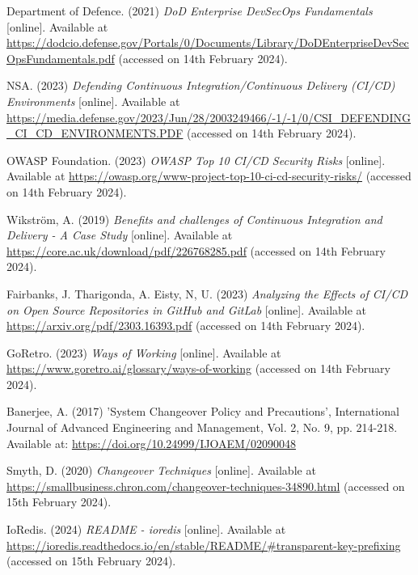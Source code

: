 \noindent Department of Defence. (2021) \textit{DoD Enterprise DevSecOps Fundamentals} [online]. Available at \url{https://dodcio.defense.gov/Portals/0/Documents/Library/DoDEnterpriseDevSecOpsFundamentals.pdf} (accessed on 14th February 2024).
\vspace{0.2cm}

\noindent NSA. (2023) \textit{Defending Continuous Integration/Continuous Delivery (CI/CD) Environments} [online]. Available at \url{https://media.defense.gov/2023/Jun/28/2003249466/-1/-1/0/CSI_DEFENDING_CI_CD_ENVIRONMENTS.PDF} (accessed on 14th February 2024).
\vspace{0.2cm}

\noindent OWASP Foundation. (2023) \textit{OWASP Top 10 CI/CD Security Risks} [online]. Available at \url{https://owasp.org/www-project-top-10-ci-cd-security-risks/} (accessed on 14th February 2024).
\vspace{0.2cm}

\noindent Wikström, A. (2019) \textit{Benefits and challenges of Continuous Integration and Delivery - A Case Study} [online]. Available at \url{https://core.ac.uk/download/pdf/226768285.pdf} (accessed on 14th February 2024).
\vspace{0.2cm}

\noindent Fairbanks, J. Tharigonda, A. Eisty, N, U. (2023) \textit{Analyzing the Effects of CI/CD on Open Source Repositories in GitHub and GitLab} [online]. Available at \url{https://arxiv.org/pdf/2303.16393.pdf} (accessed on 14th February 2024).
\vspace{0.2cm}

\noindent GoRetro. (2023) \textit{Ways of Working} [online]. Available at \url{https://www.goretro.ai/glossary/ways-of-working} (accessed on 14th February 2024).
\vspace{0.2cm}

\noindent Banerjee, A. (2017) 'System Changeover Policy and Precautions', International Journal of Advanced Engineering and Management, Vol. 2, No. 9, pp. 214-218. Available at: \url{https://doi.org/10.24999/IJOAEM/02090048}
\vspace{0.2cm}

\noindent Smyth, D. (2020) \textit{Changeover Techniques} [online]. Available at \url{https://smallbusiness.chron.com/changeover-techniques-34890.html} (accessed on 15th February 2024).
\vspace{0.2cm}

\noindent IoRedis. (2024) \textit{README - ioredis} [online]. Available at \url{https://ioredis.readthedocs.io/en/stable/README/#transparent-key-prefixing} (accessed on 15th February 2024).
\vspace{0.2cm}

